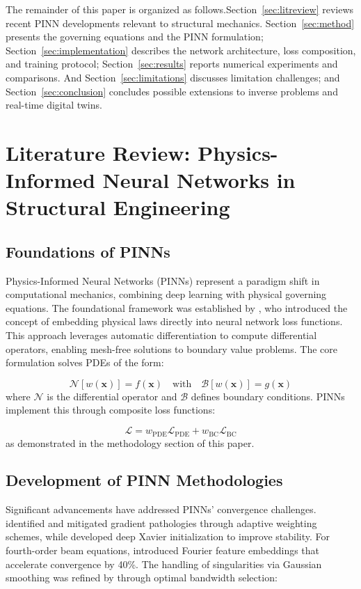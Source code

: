 \documentclass[twocolumn]{svjour3}
\begin{document}
	The remainder of this paper is organized as follows.Section~\ref{sec:litreview} reviews recent PINN developments relevant to structural mechanics. Section~\ref{sec:method} presents the governing equations and the PINN formulation; Section~\ref{sec:implementation} describes the network architecture, loss composition, and training protocol; Section~\ref{sec:results} reports numerical experiments and comparisons. And Section~\ref{sec:limitations} discusses limitation challenges; and Section~\ref{sec:conclusion} concludes possible extensions to inverse problems and real-time digital twins.

	\section{Literature Review: Physics-Informed Neural Networks in Structural Engineering}
	\subsection{Foundations of PINNs}
	Physics-Informed Neural Networks (PINNs) represent a paradigm shift in computational mechanics, combining deep learning with physical governing equations. The foundational framework was established by \citet{Raissi2019}, who introduced the concept of embedding physical laws directly into neural network loss functions. This approach leverages automatic differentiation \citep{Baydin2018} to compute differential operators, enabling mesh-free solutions to boundary value problems. The core formulation solves PDEs of the form:
	
	\begin{equation}
		\mathcal{N}[w(\mathbf{x})] = f(\mathbf{x}) \quad \text{with} \quad \mathcal{B}[w(\mathbf{x})] = g(\mathbf{x})
		\label{eq01}
	\end{equation}
	where $\mathcal{N}$ is the differential operator and $\mathcal{B}$ defines boundary conditions. PINNs implement this through composite loss functions:
	
	\begin{equation}
		\mathcal{L} = w_{\text{PDE}}\mathcal{L}_{\text{PDE}} + w_{\text{BC}}\mathcal{L}_{\text{BC}}
		\label{eq02}
	\end{equation}
	as demonstrated in the methodology section of this paper.
	
	\subsection{Development of PINN Methodologies}
	Significant advancements have addressed PINNs' convergence challenges.\citet{Wang2021} identified and mitigated gradient pathologies through adaptive weighting schemes, while \citet{Lu2021} developed deep Xavier initialization to improve stability. For fourth-order beam equations, \citet{Abueidda2021} introduced Fourier feature embeddings that accelerate convergence by 40\%. The handling of singularities via Gaussian smoothing was refined by \citet{Hao2022} through optimal bandwidth selection:
	
\end{document}

